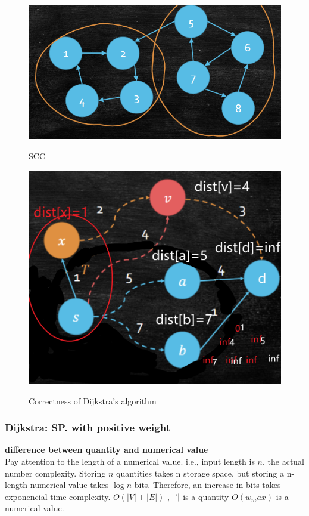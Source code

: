 \begin{figure}[htbp]
    \begin{minipage}{0.5\linewidth}
        \centering
        \includegraphics[width=0.8\linewidth]{Notes/fig/SCC.png}
        \caption{SCC}
        \label{fig:SCC}
    \end{minipage}
    \begin{minipage}{0.5\linewidth}
        \centering
        \label{fig:dijk}
        \includegraphics[width=0.5\linewidth]{Notes/fig/dijk.png}
        \caption{Correctness of Dijkstra's algorithm}
    \end{minipage}
\end{figure}




\subsubsection{Dijkstra: SP. with positive weight}
\begin{remark} \textbf{difference between quantity and numerical value}\\
    Pay attention to the length of a numerical value. i.e., input length is $n$, the actual number complexity.
    Storing $n$ quantities takes n storage space, but storing a n-length numerical value takes $\log n$ bits. Therefore, an increase in bits takes exponencial time complexity.
    $O(|V|+|E|)$ , $|`|$ is a quantity
    $O(w_max)$ is a numerical value.
\end{remark}

